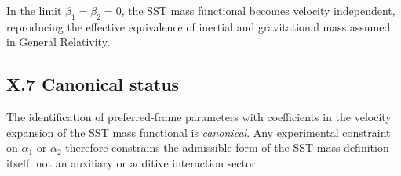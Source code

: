 \documentclass[10pt]{article}
\begin{document}
        In the limit $\beta_1 = \beta_2 = 0$, the SST mass functional becomes
        velocity independent, reproducing the effective equivalence of inertial and
        gravitational mass assumed in General Relativity.

    \subsection*{X.7 Canonical status}

        The identification of preferred-frame parameters with coefficients in the
        velocity expansion of the SST mass functional is \emph{canonical}.
        Any experimental constraint on $\alpha_1$ or $\alpha_2$ therefore constrains
        the admissible form of the SST mass definition itself, not an auxiliary or
        additive interaction sector.


        
\end{document}
